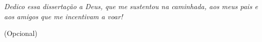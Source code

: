  \mbox{}\vfill
\begin{flushright}
\begin{minipage}{0.5\textwidth}
\textit{Dedico essa dissertação a Deus, que me sustentou na caminhada, aos meus pais e aos amigos que me incentivam a voar!}\par
(Opcional)
\end{minipage}
\end{flushright}
